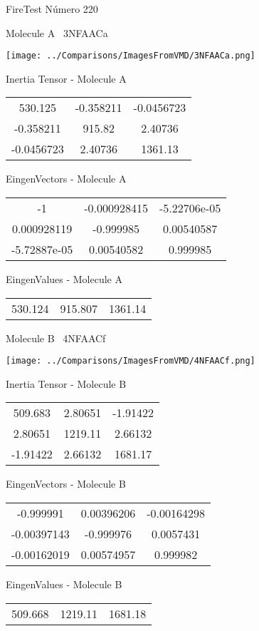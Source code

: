 \vtab[-3cm]
\begin{center}
{\large FireTest \tab Número 220}
\end{center}
\begin{multicols}{2}
\begin{center}

Molecule A \
3NFAACa

\texttt{[image: ../Comparisons/ImagesFromVMD/3NFAACa.png]}

Inertia Tensor - Molecule A \\
\begin{tabular}{|c c c|}
530.125	 & 	-0.358211	 & 	-0.0456723	 \\
-0.358211	 & 	915.82	 & 	2.40736	 \\
-0.0456723	 & 	2.40736	 & 	1361.13
\end{tabular}

\vtab
 EingenVectors - Molecule A     \\
\begin{tabular}{|c c c|}
-1	 & 	-0.000928415	 & 	-5.22706e-05	 \\
0.000928119	 & 	-0.999985	 & 	0.00540587	 \\
-5.72887e-05	 & 	0.00540582	 & 	0.999985
\end{tabular}

\vtab
 EingenValues - Molecule A     \\
\begin{tabular}{|c c c|}
530.124	 & 	915.807	 & 	1361.14	 \\
\end{tabular}
\columnbreak

Molecule B \
4NFAACf

\texttt{[image: ../Comparisons/ImagesFromVMD/4NFAACf.png]}

Inertia Tensor - Molecule B \\
\begin{tabular}{|c c c|}
509.683	 & 	2.80651	 & 	-1.91422	 \\
2.80651	 & 	1219.11	 & 	2.66132	 \\
-1.91422	 & 	2.66132	 & 	1681.17
\end{tabular}

\vtab
 EingenVectors - Molecule B     \\
\begin{tabular}{|c c c|}
-0.999991	 & 	0.00396206	 & 	-0.00164298	 \\
-0.00397143	 & 	-0.999976	 & 	0.0057431	 \\
-0.00162019	 & 	0.00574957	 & 	0.999982
\end{tabular}

\vtab
 EingenValues - Molecule B     \\
\begin{tabular}{|c c c|}
509.668	 & 	1219.11	 & 	1681.18	 \\
\end{tabular}

\end{center}
\end{multicols}

